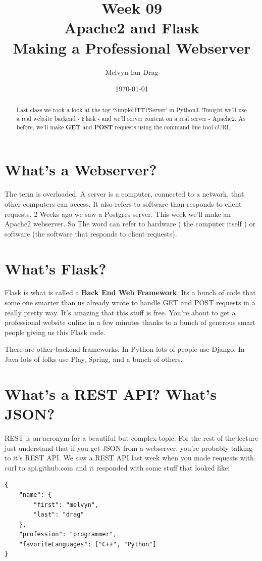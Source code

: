 \documentclass[10pt]{article}
\title{\textbf{Week 09} \\
\LARGE Apache2 and Flask \\
\Large Making a Professional Webserver}
\author{
	Melvyn Ian Drag
}
\date{\today}
\begin{document}
\maketitle

\begin{abstract}
Last class we took a look at the toy `SimpleHTTPServer' in Python3. Tonight we'll use a real website backend - Flask - and we'll server content on a real server - Apache2. As before, we'll make \textbf{GET} and \textbf{POST} requests using the command line tool cURL.
\end{abstract}


\section{What's a Webserver?}
The term is overloaded. A server is a computer, connected to a network, that
other computers can access. It also refers to software than responds to client
requests. 2 Weeks ago we saw a Postgres server. This week we'll make an Apache2
webserver. So The word can refer to hardware ( the computer itself ) or software
(the software that responds to client requests).

\section{What's Flask?}
Flask is what is called a \textbf{Back End Web Framework}. Its a bunch of code
that some one smarter than us already wrote to handle GET and POST requests in a
really pretty way. It's amazing that this stuff is free. You're about to get a
professional website online in a few minutes thanks to a bunch of generous smart
people giving us this Flask code.

There are other backend frameworks. In Python lots of people use Django. In Java
lots of folks use Play, Spring, and a bunch of others.

\section{What's a REST API? What's JSON? }
REST is an acronym for a beautiful but complex
topic. For the rest of the lecture just understand that if you get JSON from a
webserver, you're probably talking to it's REST API. We saw a REST API last week
when you made requests with curl to api.github.com and it responded with some
stuff that looked like:
 
\begin{verbatim}
{
	"name": {
		"first": "melvyn",
		"last": "drag"
	},
	"profession": "programmer",
	"favoriteLanguages": ["C++", "Python"]
}
\end{verbatim}
\end{document}
